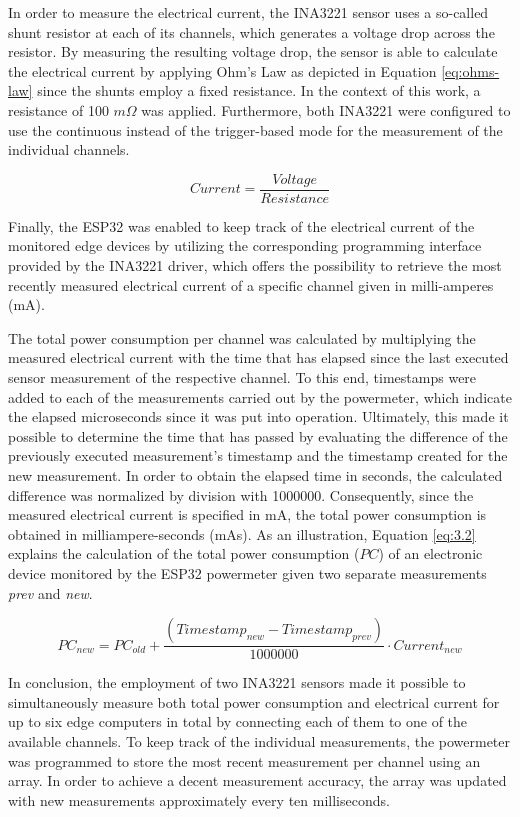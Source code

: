 In order to measure the electrical current, the INA3221 sensor uses a so-called shunt resistor at each of its channels, which generates a voltage drop across the resistor. By measuring the resulting voltage drop, the sensor is able to calculate the electrical current by applying Ohm's Law as depicted in Equation \ref{eq:ohms-law} since the shunts employ a fixed resistance. In the context of this work, a resistance of 100 $m\Omega$ was applied. Furthermore, both INA3221 were configured to use the continuous instead of the trigger-based mode for the measurement of the individual channels.

\begin{equation} \label{eq:ohms-law}
   Current = \frac{Voltage}{Resistance}
\end{equation}

Finally, the ESP32 was enabled to keep track of the electrical current of the monitored edge devices by utilizing the corresponding programming interface provided by the INA3221 driver, which offers the possibility to retrieve the most recently measured electrical current of a specific channel given in milli-amperes (mA).

The total power consumption per channel was calculated by multiplying the measured electrical current with the time that has elapsed since the last executed sensor measurement of the respective channel. To this end, timestamps were added to each of the measurements carried out by the powermeter, which indicate the elapsed microseconds since it was put into operation. Ultimately, this made it possible to determine the time that has passed by evaluating the difference of the previously executed measurement's timestamp and the timestamp created for the new measurement. In order to obtain the elapsed time in seconds, the calculated difference was normalized by division with 1000000. Consequently, since the measured electrical current is specified in mA, the total power consumption is obtained in milliampere-seconds (mAs). As an illustration, Equation \ref{eq:3.2} explains the calculation of the total power consumption ($PC$) of an electronic device monitored by the ESP32 powermeter given two separate measurements \textit{prev} and \textit{new}.

\begin{equation} \label{eq:3.2}
   PC_{new} = PC_{old} + \frac{(Timestamp_{new} - Timestamp_{prev})}{1000000} \cdot Current_{new}
\end{equation}

In conclusion, the employment of two INA3221 sensors made it possible to simultaneously measure both total power consumption and electrical current for up to six edge computers in total by connecting each of them to one of the available channels. To keep track of the individual measurements, the powermeter was programmed to store the most recent measurement per channel using an array. In order to achieve a decent measurement accuracy, the array was updated with new measurements approximately every ten milliseconds.

